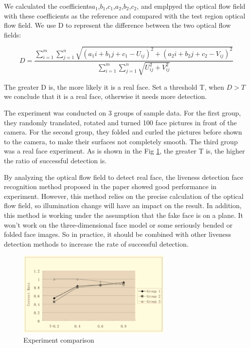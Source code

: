 \documentclass[journal]{IEEEtran}
\begin{document}
We calculated the coefficients$a_1$,$b_1$,$c_1$,$a_2$,$b_2$,$c_2$, and emplpyed the optical flow field with these coefficients as the reference and compared with the test region optical flow field. We use D to represent the difference between the two optical flow fields:

\begin{equation}
\label{eq_C_3}
D = \frac{\sum\limits_{i=1}^m\sum\limits_{j=1}^n\sqrt{(a_1i + b_1j + c_1 - U_{ij})^{2} + (a_2i + b_2j + c_2 - V_{ij})^{2}}}{\sum\limits_{i=1}^m \sum\limits_{j=1}^n \sqrt{U_{ij}^{2} + V_{ij}^{2}}}
\end{equation}

The greater D is, the more likely it is a real face. Set a threshold T, when $D > T$ we conclude that it is a real face, otherwise it needs more detection.

The experiment was conducted on 3 groups of sample data. For the first group, they randomly translated, rotated and turned 100 face pictures in front of the camera. For the second group,  they folded and curled the pictures before shown to the camera, to make their surfaces not completely smooth. The third group was a real face experiment. As is shown in the Fig \ref{fig_C_2}, the greater T is, the higher the ratio of successful detection is.

By analyzing the optical flow field to detect real face, the liveness detection face recognition method proposed in the paper showed good performance in experiment. However, this method relies on the precise calculation of the optical flow field, so illumination change will have an impact on the result. In addition, this method is working under the assumption that the fake face is on a plane. It won't work on the three-dimensional face model or some seriously bended or folded face images. So in practice, it should be combined with other liveness detection methods to increase the rate of successful detection.

\begin{figure}[!t]
\centering
\includegraphics[width=3in]{img/C_2}
\caption{Experiment comparison}
\label{fig_C_2}
\end{figure}
\end{document}
